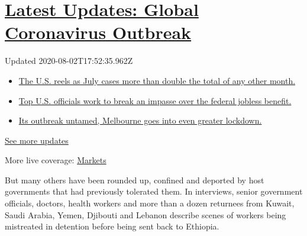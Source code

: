 \hypertarget{latest-updates-global-coronavirus-outbreak}{%
\section{\texorpdfstring{\href{https://www.nytimes3xbfgragh.onion/2020/08/01/world/coronavirus-covid-19.html?action=click\&pgtype=Article\&state=default\&region=MAIN_CONTENT_1\&context=storylines_live_updates}{Latest
Updates: Global Coronavirus
Outbreak}}{Latest Updates: Global Coronavirus Outbreak}}\label{latest-updates-global-coronavirus-outbreak}}

Updated 2020-08-02T17:52:35.962Z

\begin{itemize}
\tightlist
\item
  \href{https://www.nytimes3xbfgragh.onion/2020/08/01/world/coronavirus-covid-19.html?action=click\&pgtype=Article\&state=default\&region=MAIN_CONTENT_1\&context=storylines_live_updates\#link-34047410}{The
  U.S. reels as July cases more than double the total of any other
  month.}
\item
  \href{https://www.nytimes3xbfgragh.onion/2020/08/01/world/coronavirus-covid-19.html?action=click\&pgtype=Article\&state=default\&region=MAIN_CONTENT_1\&context=storylines_live_updates\#link-780ec966}{Top
  U.S. officials work to break an impasse over the federal jobless
  benefit.}
\item
  \href{https://www.nytimes3xbfgragh.onion/2020/08/01/world/coronavirus-covid-19.html?action=click\&pgtype=Article\&state=default\&region=MAIN_CONTENT_1\&context=storylines_live_updates\#link-2bc8948}{Its
  outbreak untamed, Melbourne goes into even greater lockdown.}
\end{itemize}

\href{https://www.nytimes3xbfgragh.onion/2020/08/01/world/coronavirus-covid-19.html?action=click\&pgtype=Article\&state=default\&region=MAIN_CONTENT_1\&context=storylines_live_updates}{See
more updates}

More live coverage:
\href{https://www.nytimes3xbfgragh.onion/live/2020/07/31/business/stock-market-today-coronavirus?action=click\&pgtype=Article\&state=default\&region=MAIN_CONTENT_1\&context=storylines_live_updates}{Markets}

But many others have been rounded up, confined and deported by host
governments that had previously tolerated them. In interviews, senior
government officials, doctors, health workers and more than a dozen
returnees from Kuwait, Saudi Arabia, Yemen, Djibouti and Lebanon
describe scenes of workers being mistreated in detention before being
sent back to Ethiopia.

